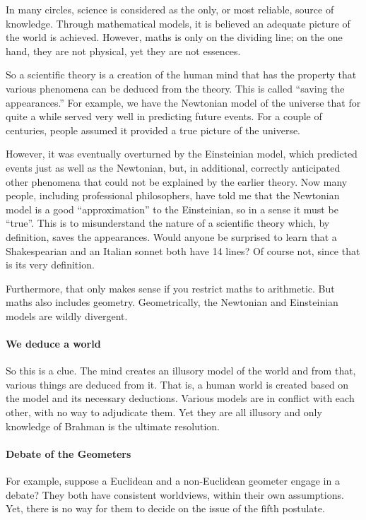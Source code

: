 In many circles, science is considered as the only, or most reliable, source of knowledge. Through mathematical models, it is believed an adequate picture of the world is achieved. However, maths is only on the dividing line; on the one hand, they are not physical, yet they are not essences.

So a scientific theory is a creation of the human mind that has the property that various phenomena can be deduced from the theory. This is called ``saving the appearances.'' For example, we have the Newtonian model of the universe that for quite a while served very well in predicting future events. For a couple of centuries, people assumed it provided a true picture of the universe.

However, it was eventually overturned by the Einsteinian model, which predicted events just as well as the Newtonian, but, in additional, correctly anticipated other phenomena that could not be explained by the earlier theory. Now many people, including professional philosophers, have told me that the Newtonian model is a good ``approximation'' to the Einsteinian, so in a sense it must be ``true''. This is to misunderstand the nature of a scientific theory which, by definition, saves the appearances. Would anyone be surprised to learn that a Shakespearian and an Italian sonnet both have 14 lines? Of course not, since that is its very definition.

Furthermore, that only makes sense if you restrict maths to arithmetic. But maths also includes geometry. Geometrically, the Newtonian and Einsteinian models are wildly divergent.

\paragraph{We deduce a world}


So this is a clue. The mind creates an illusory model of the world and from that, various things are deduced from it. That is, a human world is created based on the model and its necessary deductions. Various models are in conflict with each other, with no way to adjudicate them. Yet they are all illusory and only knowledge of Brahman is the ultimate resolution.

\paragraph{Debate of the Geometers}


For example, suppose a Euclidean and a non-Euclidean geometer engage in a debate? They both have consistent worldviews, within their own assumptions. Yet, there is no way for them to decide on the issue of the fifth postulate.


